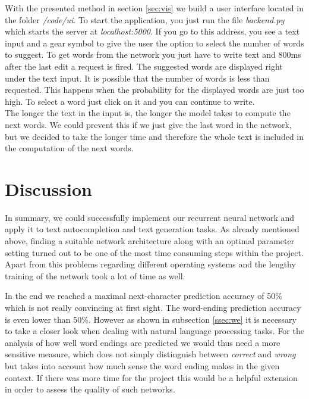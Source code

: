 \documentclass[11pt,a4paper,bibliography=totocnumbered,listof=totocnumbered]{scrartcl}
\begin{document}
With the presented method in section \ref{sec:vis} we build a user interface located in the folder \textit{/code/ui}. To start the application, you just run the file \textit{backend.py} which starts the server at \textit{localhost:5000}. If you go to this address, you see a text input and a gear symbol to give the user the option to select the number of words to suggest. To get words from the network you just have to write text and 800ms after the last edit a request is fired. The suggested words are displayed right under the text input. It is possible that the number of words is less than requested. This happens when the probability for the displayed words are just too high. To select a word just click on it and you can continue to write.\\
The longer the text in the input is, the longer the model takes to compute the next words. We could prevent this if we just give the last word in the network, but we decided to take the longer time and therefore the whole text is included in the computation of the next words.

\pagebreak
\section{Discussion}
In summary, we could successfully implement our recurrent neural network and apply it to text autocompletion and text generation tasks. As already mentioned above, finding a suitable network architecture along with an optimal parameter setting turned out to be one of the most time consuming steps within the project. Apart from this problems regarding different operating systems and the lengthy training of the network took a lot of time as well. 

In the end we reached a maximal next-character prediction accuracy of 50\% which is not really convincing at first sight. The word-ending prediction accuracy is even lower than 50\%. However as shown in subsection \ref{ssec:we} it is necessary to take a closer look when dealing with natural language processing tasks. For the analysis of how well word endings are predicted we would thus need a more sensitive measure, which does not simply distinguish between \textit{correct} and \textit{wrong} but takes into account how much sense the word ending makes in the given context. If there was more time for the project this would be a helpful extension in order to assess the quality of such networks. 
\end{document}
